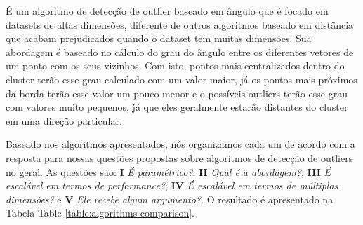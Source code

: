 É um algoritmo de detecção de outlier baseado em ângulo \cite{Kriegel:2008:AOD:1401890.1401946} que é focado em datasets de altas dimensões, diferente de outros algoritmos baseado em distãncia que acabam prejudicados quando o dataset tem muitas dimensões. Sua abordagem é baseado no cálculo do grau do ângulo entre os diferentes vetores de um ponto com os seus vizinhos. Com isto, pontos mais centralizados dentro do cluster terão esse grau calculado com um valor maior, já os pontos mais próximos da borda terão esse valor um pouco menor e o possíveis outliers terão esse grau com valores muito pequenos, já que eles geralmente estarão distantes do cluster em uma direção particular. 

\vspace{25pt}

Baseado nos algoritmos apresentados, nós organizamos cada um de acordo com a resposta para nossas questões propostas sobre algoritmos de detecção de outliers no geral. As questões são: \textbf{I} \textit{É paramétrico?}; \textbf{II} \textit{Qual é a abordagem?}; \textbf{III} \textit{É escalável em termos de performance?}; \textbf{IV} \textit{É escalável em termos de múltiplas dimensões?} e \textbf{V} \textit{Ele recebe algum argumento?}. O resultado é apresentado na Tabela Table \ref{table:algorithms-comparison}.

